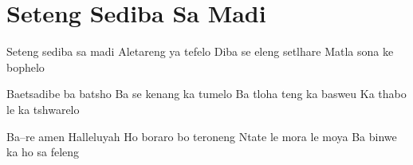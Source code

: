 \starttocol
\chapter{Seteng Sediba Sa Madi}
\nexttocol
\hfill{\it }
\stoptocol
\starttocol
\startlines
{\sc Seteng} sediba sa madi 
Aletareng ya tefelo 
Diba se eleng setlhare 
Matla sona ke bophelo

Baetsadibe ba batsho 
Ba se kenang ka tumelo 
Ba tloha teng ka basweu
Ka thabo le ka tshwarelo

Ba--re amen Halleluyah
Ho boraro bo teroneng
Ntate le mora le moya 
Ba binwe ka ho sa feleng
\stoplines
\nexttocol

\stoptocol
